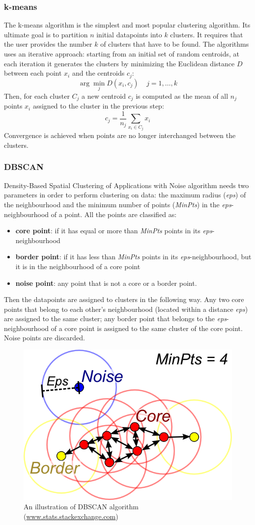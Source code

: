 \documentclass[11pt]{article}
\begin{document}
\subsubsection{k-means}
The k-means algorithm is the simplest and most popular clustering algorithm. Its ultimate goal is to partition $n$ initial datapoints into $k$ clusters. It requires that the user provides the number $k$ of clusters that have to be found. The algorithms uses an iterative approach: starting from an initial set of random centroids, at each iteration it generates the clusters by minimizing the Euclidean distance $D$ between each point $x_i$  and  the centroids $c_j$:  
$$\arg \min\limits_{j}D(x_i, c_j)\;\;\;\; j = 1, \dots, k$$
Then, for each cluster $C_j$ a new centroid $c_j$ is computed as the mean of all $n_j$ points $x_i$ assigned to the cluster in the previous step: 
$$c_j = \frac{1}{n_j} \sum_{x_i \in C_j} x_i$$
Convergence is achieved when points are no longer interchanged between the clusters.


\subsubsection{DBSCAN}
Density-Based Spatial Clustering of Applications with Noise algorithm needs two parameters in order to perform clustering on data: the maximum radius (\textit{eps}) of the neighbourhood and the minimum number of points (\textit{MinPts}) in the \textit{eps}-neighbourhood of a point. All the points are classified as: 
\begin{itemize}
	\item \textbf{core point}: if it has equal or more than \textit{MinPts} points in its  \textit{eps}-neighbourhood 
	\item \textbf{border point}: if it has less than \textit{MinPts} points in its  \textit{eps}-neighbourhood, but it is in the neighbourhood of a core point
	\item \textbf{noise point}: any point that is not a core or a border point.
\end{itemize} 
Then the datapoints are assigned to clusters in the following way. Any two core points that belong to each other's neighbourhood (located within a distance \textit{eps}) are assigned to the same cluster; any border point that belongs to the \textit{eps}-neighbourhood of a core point is assigned to the same cluster of the core point. Noise points are discarded. 

\begin{figure}[h]
	\centering
	\includegraphics[width=0.4\linewidth]{./img/dbscan}
	\caption{An illustration of DBSCAN algorithm (\url{www.stats.stackexchange.com})}
	\label{fig:dbscan}
\end{figure}
\end{document}
